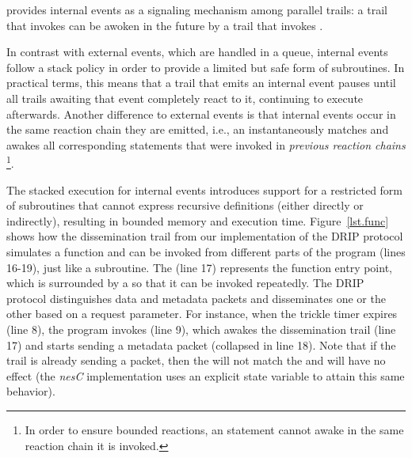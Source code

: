 
\CEU provides internal events as a signaling mechanism among parallel trails:
a trail that invokes  can be awoken in the future by a trail that 
invokes .

In contrast with external events, which are handled in a queue, internal events 
follow a stack policy in order to provide a limited but safe form of 
subroutines.
In practical terms, this means that a trail that emits an internal event pauses 
until all trails awaiting that event completely react to it, continuing to 
execute afterwards.
%
Another difference to external events is that internal events occur in the same 
reaction chain they are emitted, i.e., an  instantaneously matches 
and awakes all corresponding  statements that were invoked in 
\emph{previous reaction chains}%
\footnote{In order to ensure bounded reactions, an  statement 
cannot awake in the same reaction chain it is invoked.}.

The stacked execution for internal events introduces support for a restricted 
form of subroutines that cannot express recursive definitions (either directly 
or indirectly), resulting in bounded memory and execution time.
%
Figure~\ref{lst.func} shows how the dissemination trail from our implementation 
of the DRIP protocol simulates a function and can be invoked from different 
parts of the program (lines 16-19), just like a subroutine.
The  (line 17) represents the function entry point, which is 
surrounded by a  so that it can be invoked repeatedly.
The DRIP protocol distinguishes data and metadata packets and disseminates one 
or the other based on a request parameter.
For instance, when the trickle timer expires (line 8), the program invokes 
 (line 9), which awakes the dissemination trail (line 17) 
and starts sending a metadata packet (collapsed in line 18).
Note that if the trail is already sending a packet, then the  will 
not match the  and will have no effect (the \emph{nesC} 
implementation uses an explicit state variable to attain this same behavior).



